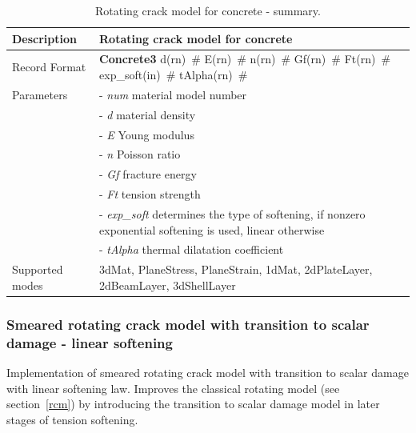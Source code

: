\documentclass[epsf,a4paper]{article}
\newcommand{\descitem}[1]{{\noindent \bf #1}}
\newcommand{\elemparam}[2]{{{#1\tiny (#2)}~\#}}
\newcommand{\param}[1]{{\it #1}}
\begin{document}
\begin{table}[h]                                                                
\begin{tabular}{|l|p{9cm}|}                                                      
\hline                                                                          
Description & Rotating crack model for concrete\\
\hline                                                                          
Record Format & \descitem{Concrete3} \elemparam{d}{rn} \elemparam{E}{rn}
\elemparam{n}{rn} \elemparam{Gf}{rn} \elemparam{Ft}{rn} \elemparam{exp\_soft}{in} \elemparam{tAlpha}{rn} \\
Parameters &- \param{num} material model number\\
&- \param{d} material density\\
&- \param{E} Young modulus\\
&- \param{n} Poisson ratio\\
&- \param{Gf} fracture energy\\
&- \param{Ft} tension strength\\
&- \param{exp\_soft} determines the type of softening, if nonzero
exponential softening is used, linear otherwise\\
&- \param{tAlpha} thermal dilatation coefficient\\
Supported modes& 3dMat, PlaneStress, PlaneStrain, 1dMat,
2dPlateLayer, 2dBeamLayer, 3dShellLayer\\
\hline
\end{tabular}                                                                   
\caption{Rotating crack model for concrete - summary.}                
\label{rcm_table}                                                         
\end{table}                                                                     



\subsubsection{Smeared rotating crack model with transition to scalar
damage - linear softening}
\label{rcsd}
Implementation of smeared rotating crack model with transition to
scalar damage with linear softening law. 
Improves the classical rotating model (see
section~\ref{rcm}) by introducing the transition to scalar damage
model in  later stages of tension softening. 
\end{document}
